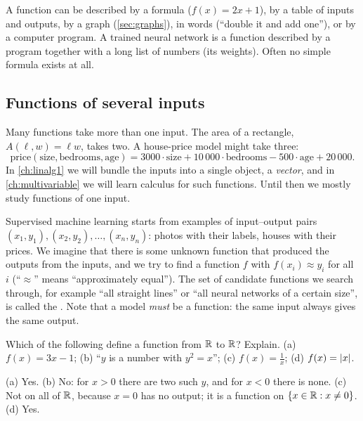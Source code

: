 A function can be described by a formula ($f(x) = 2x + 1$), by a table of
inputs and outputs, by a graph (\cref{sec:graphs}), in words (``double it and
add one''), or by a computer program. A trained neural network is a function
described by a program together with a long list of numbers (its weights).
Often no simple formula exists at all.

\subsection{Functions of several inputs}

Many functions take more than one input. The area of a rectangle,
$A(\ell, w) = \ell w$, takes two. A house-price model might take three:
\[
  \text{price}(\text{size}, \text{bedrooms}, \text{age})
  = 3000\cdot\text{size} + 10\,000\cdot\text{bedrooms} - 500\cdot\text{age}
  + 20\,000 .
\]
In \cref{ch:linalg1} we will bundle the inputs into a single object, a
\emph{vector}, and in \cref{ch:multivariable} we will learn calculus for such
functions. Until then we mostly study functions of one input.

\begin{mlnote}
Supervised machine learning starts from examples of input--output pairs
$(x_1, y_1), (x_2, y_2), \dots, (x_n, y_n)$: photos with their labels, houses
with their prices. We imagine that there is some unknown function that
produced the outputs from the inputs, and we try to find a function $f$ with
$f(x_i) \approx y_i$ for all $i$ (``$\approx$'' means ``approximately
equal''). The set of candidate functions we search through, for example
``all straight lines'' or ``all neural networks of a certain size'', is
called the . Note that a model \emph{must} be a
function: the same input always gives the same output.
\end{mlnote}

\sectionexercises

\begin{exercise}
Which of the following define a function from $\mathbb{R}$ to $\mathbb{R}$? Explain.
(a) $f(x) = 3x - 1$; (b) ``$y$ is a number with $y^2 = x$'';
(c) $f(x) = \tfrac1x$; (d) $f(x) = \lvert x\rvert$.
\end{exercise}
\begin{solution}
(a) Yes. (b) No: for $x > 0$ there are two such $y$, and for $x < 0$ there is
none. (c) Not on all of $\mathbb{R}$, because $x = 0$ has no output; it is a function
on $\{x \in \mathbb{R} : x\neq0\}$. (d) Yes.
\end{solution}

